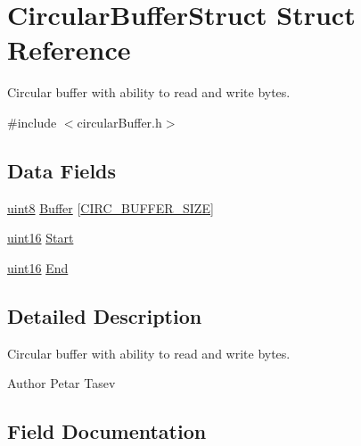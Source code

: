 \hypertarget{struct_circular_buffer_struct}{}\section{Circular\+Buffer\+Struct Struct Reference}
\label{struct_circular_buffer_struct}


Circular buffer with ability to read and write bytes.  




{\ttfamily \#include $<$circular\+Buffer.\+h$>$}

\subsection*{Data Fields}
\begin{DoxyCompactItemize}
\item 
\hyperlink{_h_y_d_r_a_s_8_x_2types_8h_a33a5e996e7a90acefb8b1c0bea47e365}{uint8} \hyperlink{struct_circular_buffer_struct_a490a001f53f2194dc8acd486ec9cb11f}{Buffer} \mbox{[}\hyperlink{_w_c_b_8_x_2circular_buffer_8h_aa5ca2c86845f72ebb719d7019a081739}{C\+I\+R\+C\+\_\+\+B\+U\+F\+F\+E\+R\+\_\+\+S\+I\+Z\+E}\mbox{]}
\item 
\hyperlink{_h_y_d_r_a_s_8_x_2types_8h_ac2a9e79eb120216f855626495b7bd18a}{uint16} \hyperlink{struct_circular_buffer_struct_a90df916af143181811b3da72397fc15c}{Start}
\item 
\hyperlink{_h_y_d_r_a_s_8_x_2types_8h_ac2a9e79eb120216f855626495b7bd18a}{uint16} \hyperlink{struct_circular_buffer_struct_aa2432381b7551368cc3e528f28a97ac0}{End}
\end{DoxyCompactItemize}


\subsection{Detailed Description}
Circular buffer with ability to read and write bytes. 

\begin{DoxyAuthor}{Author}
Petar Tasev 
\end{DoxyAuthor}


\subsection{Field Documentation}
\hypertarget{struct_circular_buffer_struct_a490a001f53f2194dc8acd486ec9cb11f}{}
